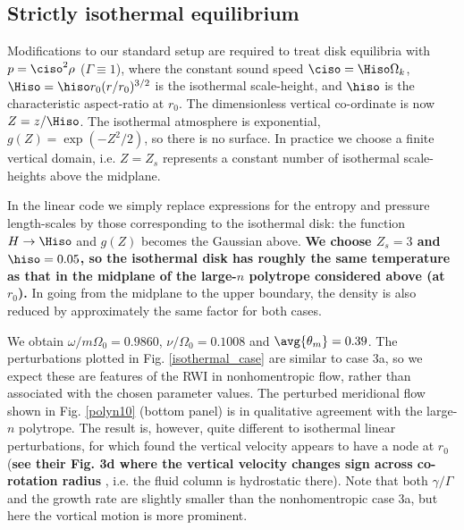 \subsection{Strictly isothermal equilibrium}
Modifications to our standard setup are required to treat  
disk equilibria with $p=\ciso^2\rho$ ($\Gamma\equiv 1$), where 
the constant sound speed $\ciso=\Hiso\Omega_k$, $\Hiso=\hiso
r_0(r/r_0)^{3/2}$ is the isothermal scale-height, and $\hiso$ is the
characteristic aspect-ratio at $r_0$. 
The dimensionless vertical 
co-ordinate is now $Z=z/\Hiso$. The isothermal atmosphere is
exponential, $g(Z)=\exp{(-Z^2/2)}$, so there is no surface. In
practice we choose a finite vertical domain, i.e. $Z=Z_s$ represents a
constant number of isothermal scale-heights above the midplane. 

In the linear code we simply replace expressions for the entropy
and pressure length-scales by those corresponding to the isothermal
disk: the function $H\to\Hiso$ and $g(Z)$ becomes the Gaussian above. 
{\bf
We choose $Z_s=3$ and $\hiso=0.05$, so the isothermal disk has roughly
the same temperature as that in the midplane of the large-$n$ 
polytrope considered above (at $r_0$).} In going from the
midplane to the upper boundary, the density is also reduced by
approximately the same factor for both cases.  


We obtain $\omega/m\Omega_0=0.9860$, $\nu/\Omega_0=0.1008$ and
$\avg{\theta_m}=0.39$. The perturbations plotted in
Fig. \ref{isothermal_case} are similar to case 3a, so we expect these
are features of the RWI in nonhomentropic flow, rather than
associated with the chosen parameter values. The perturbed meridional
flow shown in Fig. \ref{polyn10} (bottom panel) is in qualitative
agreement with the large-$n$ polytrope. 
The result is, however, quite different to
isothermal linear perturbations, for which \cite{meheut12} found the 
vertical velocity appears to have a node at $r_0$ ({\bf see their Fig. 3d where the vertical velocity changes sign across co-rotation radius}
, i.e. the fluid column is hydrostatic there). 
Note that both $\gamma/\Gamma$
and the growth rate are slightly smaller than the nonhomentropic case 3a,
but here the vortical motion is more prominent. 

